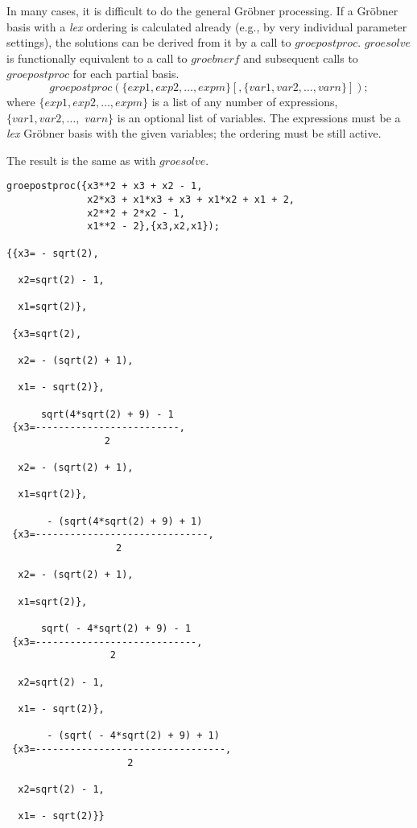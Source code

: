 In many cases, it is difficult to do the general Gr\"obner processing.
If a Gr\"obner basis with a {\it lex} ordering is calculated already (e.g.,
by very individual parameter settings), the solutions can be derived
from it by a call to $groepostproc$. $groesolve$ is functionally
equivalent to a call to $groebnerf$ and subsequent calls to
$groepostproc$ for each partial basis.
\[
 groepostproc(\{exp1, exp2, \ldots , expm\}[,\{var1, var2, \ldots ,
varn\}]);
\]
where $\{exp1, exp2, \ldots , expm\}$ is a list of any number of
expressions, \linebreak[4] $\{var1, var2, \ldots ,$ $ varn\}$ is an
optional list of variables. The expressions must be a {\it lex} Gr\"obner
basis with the given variables; the ordering must be still active.

The result is the same as with $groesolve$.

\begin{verbatim}
groepostproc({x3**2 + x3 + x2 - 1,
              x2*x3 + x1*x3 + x3 + x1*x2 + x1 + 2,
              x2**2 + 2*x2 - 1,
              x1**2 - 2},{x3,x2,x1});

{{x3= - sqrt(2),

  x2=sqrt(2) - 1,

  x1=sqrt(2)},

 {x3=sqrt(2),

  x2= - (sqrt(2) + 1),

  x1= - sqrt(2)},

      sqrt(4*sqrt(2) + 9) - 1
 {x3=-------------------------,
                 2

  x2= - (sqrt(2) + 1),

  x1=sqrt(2)},

       - (sqrt(4*sqrt(2) + 9) + 1)
 {x3=------------------------------,
                   2

  x2= - (sqrt(2) + 1),

  x1=sqrt(2)},

      sqrt( - 4*sqrt(2) + 9) - 1
 {x3=----------------------------,
                  2

  x2=sqrt(2) - 1,

  x1= - sqrt(2)},

       - (sqrt( - 4*sqrt(2) + 9) + 1)
 {x3=---------------------------------,
                     2

  x2=sqrt(2) - 1,

  x1= - sqrt(2)}}
\end{verbatim}

